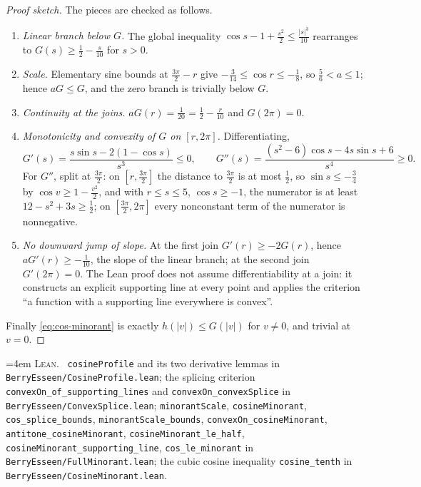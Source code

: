\documentclass[10pt,a4paper]{article}
\theoremstyle{plain}
\theoremstyle{definition}
\newcommand{\lean}[1]{\texttt{#1}}
\newcommand{\file}[1]{\texttt{#1}}
\newenvironment{leanref}%
  {\par\addvspace{3pt}\begingroup\sloppy\emergencystretch=4em
   \noindent\footnotesize\textsc{Lean.}\ \ignorespaces}%
  {\par\endgroup\addvspace{3pt}}
\begin{document}
\begin{proof}[Proof sketch]
The pieces are checked as follows.
\begin{enumerate}[leftmargin=2.2em]
\item \emph{Linear branch below $G$.} The global inequality
  $\cos s-1+\tfrac{s^2}{2}\le\tfrac{|s|^3}{10}$ rearranges to
  $G(s)\ge\tfrac12-\tfrac{s}{10}$ for $s>0$.
\item \emph{Scale.} Elementary sine bounds at $\tfrac{3\pi}{2}-r$ give
  $-\tfrac3{14}\le\cos r\le-\tfrac18$, so $\tfrac56<a\le1$; hence
  $aG\le G$, and the zero branch is trivially below $G$.
\item \emph{Continuity at the joins.} $aG(r)=\tfrac1{20}=\tfrac12-\tfrac r{10}$
  and $G(2\pi)=0$.
\item \emph{Monotonicity and convexity of $G$ on $[r,2\pi]$.} Differentiating,
  \[
    G'(s) = \frac{s\sin s-2(1-\cos s)}{s^3}\le0,
    \qquad
    G''(s) = \frac{(s^2-6)\cos s-4s\sin s+6}{s^4}\ge0 .
  \]
  For $G''$, split at $\tfrac{3\pi}{2}$: on $[r,\tfrac{3\pi}{2}]$ the distance
  to $\tfrac{3\pi}{2}$ is at most $\tfrac12$, so $\sin s\le-\tfrac34$ by
  $\cos v\ge1-\tfrac{v^2}{2}$, and with $r\le s\le5$, $\cos s\ge-1$, the
  numerator is at least $12-s^2+3s\ge\tfrac12$; on $[\tfrac{3\pi}{2},2\pi]$
  every nonconstant term of the numerator is nonnegative.
\item \emph{No downward jump of slope.} At the first join
  $G'(r)\ge-2G(r)$, hence $aG'(r)\ge-\tfrac1{10}$, the slope of the linear
  branch; at the second join $G'(2\pi)=0$. The Lean proof does not assume
  differentiability at a join: it constructs an explicit supporting line at
  every point and applies the criterion ``a function with a supporting line
  everywhere is convex''.
\end{enumerate}
Finally \eqref{eq:cos-minorant} is exactly $h(|v|)\le G(|v|)$ for $v\ne0$, and
trivial at $v=0$.
\end{proof}

\begin{leanref}
\lean{cosineProfile} and its two derivative lemmas in
\file{BerryEsseen/CosineProfile.lean}; the splicing criterion
\lean{convexOn\_of\_supporting\_lines} and \lean{convexOn\_convexSplice} in
\file{BerryEsseen/ConvexSplice.lean}; \lean{minorantScale},
\lean{cosineMinorant}, \lean{cos\_splice\_bounds}, \lean{minorantScale\_bounds},
\lean{convexOn\_cosineMinorant}, \lean{antitone\_cosineMinorant},
\lean{cosineMinorant\_le\_half}, \lean{cosineMinorant\_supporting\_line},
\lean{cos\_le\_minorant} in \file{BerryEsseen/FullMinorant.lean}; the cubic
cosine inequality \lean{cosine\_tenth} in
\file{BerryEsseen/CosineMinorant.lean}.
\end{leanref}
\end{document}
